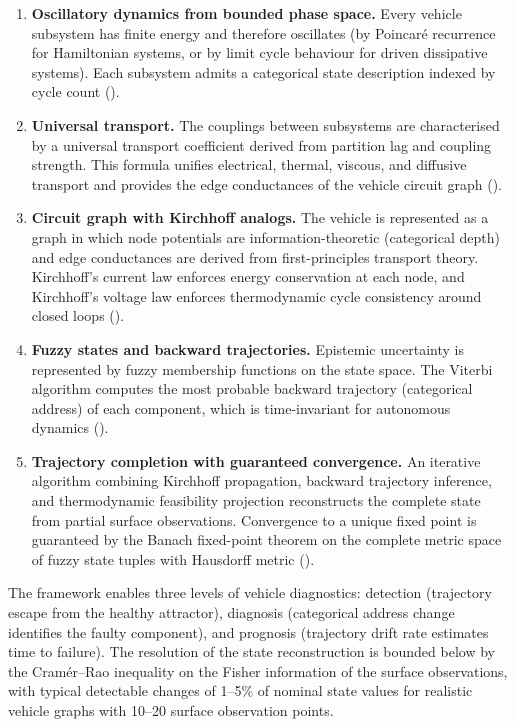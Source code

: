 \documentclass[twocolumn,10pt,a4paper]{article}
\theoremstyle{definition}
\theoremstyle{remark}
\begin{document}
\begin{enumerate}[label=(\arabic*)]
\item \textbf{Oscillatory dynamics from bounded phase space.} Every vehicle subsystem has finite energy and therefore oscillates (by Poincar\'{e} recurrence for Hamiltonian systems, or by limit cycle behaviour for driven dissipative systems). Each subsystem admits a categorical state description indexed by cycle count ().

\item \textbf{Universal transport.} The couplings between subsystems are characterised by a universal transport coefficient derived from partition lag and coupling strength. This formula unifies electrical, thermal, viscous, and diffusive transport and provides the edge conductances of the vehicle circuit graph ().

\item \textbf{Circuit graph with Kirchhoff analogs.} The vehicle is represented as a graph in which node potentials are information-theoretic (categorical depth) and edge conductances are derived from first-principles transport theory. Kirchhoff's current law enforces energy conservation at each node, and Kirchhoff's voltage law enforces thermodynamic cycle consistency around closed loops ().

\item \textbf{Fuzzy states and backward trajectories.} Epistemic uncertainty is represented by fuzzy membership functions on the state space. The Viterbi algorithm computes the most probable backward trajectory (categorical address) of each component, which is time-invariant for autonomous dynamics ().

\item \textbf{Trajectory completion with guaranteed convergence.} An iterative algorithm combining Kirchhoff propagation, backward trajectory inference, and thermodynamic feasibility projection reconstructs the complete state from partial surface observations. Convergence to a unique fixed point is guaranteed by the Banach fixed-point theorem on the complete metric space of fuzzy state tuples with Hausdorff metric ().
\end{enumerate}

The framework enables three levels of vehicle diagnostics: detection (trajectory escape from the healthy attractor), diagnosis (categorical address change identifies the faulty component), and prognosis (trajectory drift rate estimates time to failure). The resolution of the state reconstruction is bounded below by the Cram\'{e}r--Rao inequality on the Fisher information of the surface observations, with typical detectable changes of 1--5\% of nominal state values for realistic vehicle graphs with 10--20 surface observation points.
\end{document}

